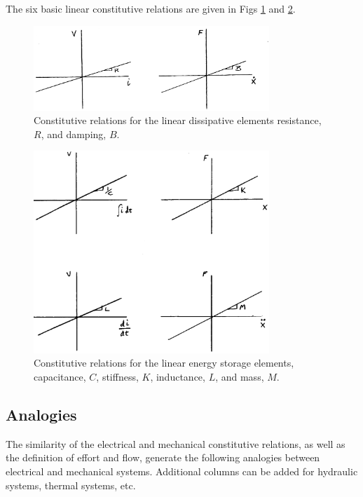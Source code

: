  The six basic linear constitutive relations are given in Figs \ref{ConstitRelationsDissipative} and \ref{ConstitRelationsStorage}.	%


\begin{figure}[h]	%
\centering \includegraphics[width=3.5in]{figs14/00315.eps}
\caption{Constitutive relations for the linear dissipative elements resistance, $R$, and damping, $B$.}\label{ConstitRelationsDissipative}	%
\end{figure}	%


\begin{figure}[h]	%
\centering \includegraphics[width=3.5in]{figs14/00316.eps}
\caption{Constitutive relations for the linear energy storage elements, capacitance, $C$, stiffness, $K$, inductance, $L$, and mass, $M$.}\label{ConstitRelationsStorage}	%
\end{figure}	%


\subsection{Analogies}
 The similarity of the electrical and mechanical constitutive relations, as well as the definition of effort and flow, generate the following analogies between electrical and mechanical systems.   Additional columns can be added for hydraulic systems, thermal systems, etc.	%

